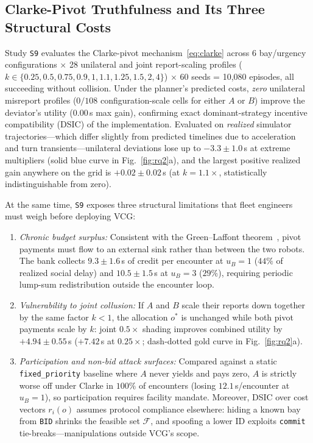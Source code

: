 \documentclass[letterpaper,journal]{IEEEtran}
\begin{document}
\subsection{Clarke-Pivot Truthfulness and Its Three Structural Costs}
Study \texttt{S9} evaluates the Clarke-pivot mechanism~\eqref{eq:clarke} across 6 bay/urgency configurations $\times$ 28 unilateral and joint report-scaling profiles ($k\in\{0.25, 0.5, 0.75, 0.9, 1, 1.1, 1.25, 1.5, 2, 4\}$) $\times$ 60 seeds = 10,080 episodes, all succeeding without collision. Under the planner's predicted costs, \emph{zero} unilateral misreport profiles ($0/108$ configuration-scale cells for either $A$ or $B$) improve the deviator's utility ($0.00$\,s max gain), confirming exact dominant-strategy incentive compatibility (DSIC) of the implementation. Evaluated on \emph{realized} simulator trajectories---which differ slightly from predicted timelines due to acceleration and turn transients---unilateral deviations lose up to $-3.3\pm 1.0$\,s at extreme multipliers (solid blue curve in Fig.~\ref{fig:rq2}a), and the largest positive realized gain anywhere on the grid is $+0.02\pm 0.02$\,s (at $k=1.1\times$, statistically indistinguishable from zero).

At the same time, \texttt{S9} exposes three structural limitations that fleet engineers must weigh before deploying VCG:
\begin{enumerate}
\item \emph{Chronic budget surplus:} Consistent with the Green--Laffont theorem~\cite{green1977characterization}, pivot payments must flow to an external sink rather than between the two robots. The bank collects $9.3\pm 1.6$\,s of credit per encounter at $u_B=1$ ($44\%$ of realized social delay) and $10.5\pm 1.5$\,s at $u_B=3$ ($29\%$), requiring periodic lump-sum redistribution outside the encounter loop.
\item \emph{Vulnerability to joint collusion:} If $A$ and $B$ scale their reports down together by the same factor $k<1$, the allocation $o^\ast$ is unchanged while both pivot payments scale by $k$: joint $0.5\times$ shading improves combined utility by $+4.94\pm 0.55$\,s ($+7.42$\,s at $0.25\times$; dash-dotted gold curve in Fig.~\ref{fig:rq2}a).
\item \emph{Participation and non-bid attack surfaces:} Compared against a static \texttt{fixed\_priority} baseline where $A$ never yields and pays zero, $A$ is strictly worse off under Clarke in $100\%$ of encounters (losing $12.1$\,s/encounter at $u_B=1$), so participation requires facility mandate. Moreover, DSIC over cost vectors $r_i(o)$ assumes protocol compliance elsewhere: hiding a known bay from \texttt{BID} shrinks the feasible set $\mathcal{F}$, and spoofing a lower ID exploits \texttt{commit} tie-breaks---manipulations outside VCG's scope.
\end{enumerate}
\end{document}

